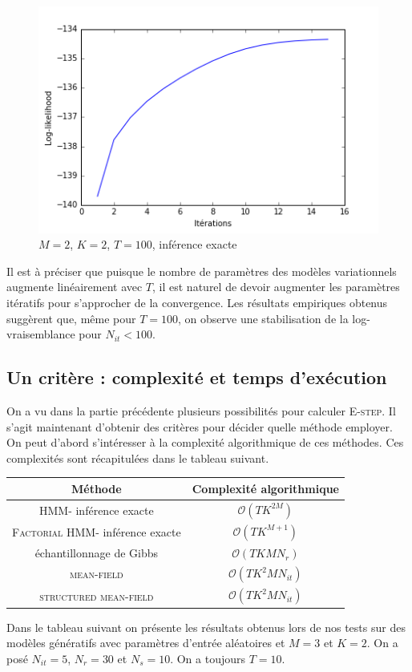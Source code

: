 \documentclass[10pt,a4paper]{article}
\newcommand{\hmm}{\textsc{HMM}}
\newcommand{\fhmm}{\textsc{Factorial HMM}}
\newcommand{\Estep}{\textsc{E-step}}
\newcommand{\meanfield}{\textsc{mean-field}}
\newcommand{\structmeanfield}{\textsc{structured mean-field}}
\begin{document}
 \begin{figure}[H]
\centering
\includegraphics[scale=0.5]{../resources/pictures/M2_K2_T100_exactinference.png}
\caption{$M=2$, $K=2$, $T=100$, inférence exacte}
\end{figure}

Il est à préciser que puisque le nombre de paramètres des modèles variationnels augmente linéairement
avec $T$, il est naturel de devoir augmenter les paramètres itératifs pour s'approcher de la convergence.
Les résultats empiriques obtenus suggèrent que, même pour $T=100$, on observe une stabilisation de la 
log-vraisemblance pour $N_{it}<100$.
\subsection{Un critère : complexité et temps d'exécution}
On a vu dans la partie précédente plusieurs possibilités pour calculer \Estep. Il s'agit maintenant
 d'obtenir des critères pour décider quelle méthode employer. On peut d'abord s'intéresser à la 
 complexité algorithmique de ces méthodes. Ces complexités sont récapitulées dans le tableau suivant.
\newline
\begin{center}
\begin{tabular}{|c|c|}
\hline
Méthode & Complexité algorithmique \\
\hline \hline
\hmm - inférence exacte &  $\mathcal{O}(TK^{2M})$ \\ \hline
\fhmm - inférence exacte &  $\mathcal{O}(TK^{M+1})$ \\ \hline
échantillonnage de Gibbs &  $\mathcal{O}(TKM N_r )$ \\ \hline
\meanfield & $\mathcal{O}(TK^2MN_{it})$ \\ \hline
\structmeanfield & $\mathcal{O}(TK^2MN_{it})$ \\ \hline
\end{tabular}
\end{center}
Dans le tableau suivant on présente les résultats obtenus lors de nos tests sur des modèles génératifs
 avec paramètres d'entrée aléatoires et $M=3$ et $K=2$. On a posé $N_{it}=5$, $N_r=30$ et $N_s=10$. On a toujours $T=10$.
 
\end{document}
